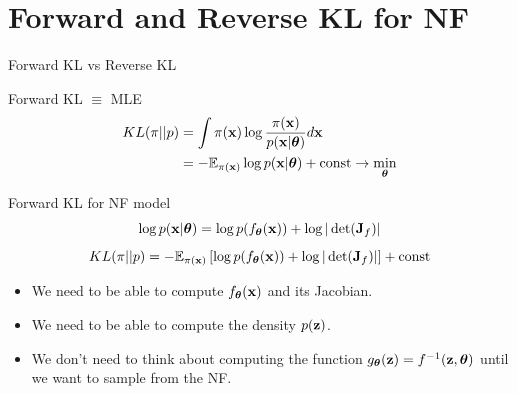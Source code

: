 \section{Forward and Reverse KL for NF}
\begin{frame}{Forward KL vs Reverse KL}
	\begin{block}{Forward KL $\equiv$ MLE}
		\vspace{-0.5cm}
		\begin{align*}
			KL(\pi || p) &= \int \pi (\mathbf{x}) \log \frac{\pi(\mathbf{x})}{p(\mathbf{x} | \boldsymbol{\theta})} d \mathbf{x} \\
			&= - \mathbb{E}_{\pi(\mathbf{x})} \log p(\mathbf{x} | \boldsymbol{\theta}) + \text{const} \rightarrow \min_{\boldsymbol{\theta}}
		\end{align*}
	\end{block}
	\begin{block}{Forward KL for NF model}
	    \vspace{-0.1cm}
		\[
			\log p(\mathbf{x}|\boldsymbol{\theta}) = \log p(f_{\boldsymbol{\theta}}(\mathbf{x})) + \log  |\det (\mathbf{J}_f)|
		\]		
		\[
			KL(\pi || p)  = - \mathbb{E}_{\pi(\mathbf{x})} \left[\log p(f_{\boldsymbol{\theta}}(\mathbf{x})) + \log  |\det (\mathbf{J}_f)|\right] + \text{const} 
		\]
		\vspace{-0.2cm}
		\begin{itemize}
			\item We need to be able to compute $f_{\boldsymbol{\theta}}(\mathbf{x})$ and its Jacobian.
			\item We need to be able to compute the density $p(\mathbf{z})$.
			\item We don’t need to think about computing the function $g_{\boldsymbol{\theta}}(\mathbf{z}) = f^{-1}(\mathbf{z}, \boldsymbol{\theta})$ until we want to sample from the NF.
		\end{itemize}
	\end{block}
\end{frame}
